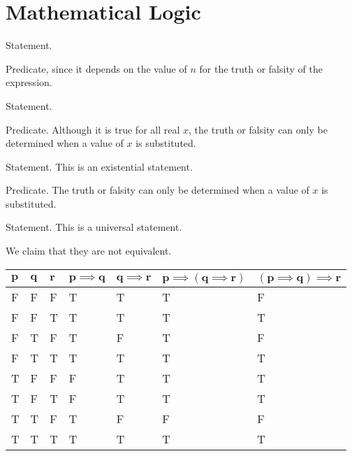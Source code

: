 \section{Mathematical Logic}
\begin{questions}
    \item \begin{partquestions}{\alph*}
        \item Statement.
        \item Predicate, since it depends on the value of $n$ for the truth or falsity of the expression.
        \item Statement.
        \item Predicate. Although it is true for all real $x$, the truth or falsity can only be determined when a value of $x$ is substituted.
        \item Statement. This is an existential statement.
        \item Predicate. The truth or falsity can only be determined when a value of $x$ is substituted.
        \item Statement. This is a universal statement.
    \end{partquestions}

    \item \begin{partquestions}{\alph*}
        \item We claim that they are not equivalent.
        \begin{table}[h]
            \centering
            \begin{tabular}{|l|l|l||l|l||l|l|}
                \hline
                $\boldsymbol{p}$ & $\boldsymbol{q}$ & $\boldsymbol{r}$ & $\boldsymbol{p \implies q}$ & $\boldsymbol{q \implies r}$ & $\boldsymbol{p \implies (q \implies r)}$ & $\boldsymbol{(p \implies q) \implies r}$ \\ \hline
                F & F & F & T & T & T & F \\ \hline
                F & F & T & T & T & T & T \\ \hline
                F & T & F & T & F & T & F \\ \hline
                F & T & T & T & T & T & T \\ \hline
                T & F & F & F & T & T & T \\ \hline
                T & F & T & F & T & T & T \\ \hline
                T & T & F & T & F & F & F \\ \hline
                T & T & T & T & T & T & T \\ \hline
            \end{tabular}
        \end{table}
       

\end{partquestions}
\end{questions}
